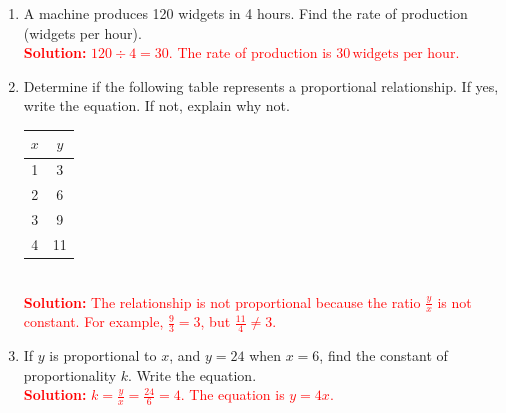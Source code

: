 \documentclass[10pt]{article}
\begin{document}
\begin{tcolorbox}[colframe=black!60, colback=white, 
coltitle=black, colbacktitle=black!15, fonttitle=\bfseries\Large, 
title=Exercises, halign title=center, left=10pt, right=10pt, top=10pt, bottom=35pt]
\begin{enumerate}[itemsep=2em]
    \item A machine produces 120 widgets in 4 hours. Find the rate of production (widgets per hour).\\
    \textcolor{red}{\textbf{Solution:} \(120 \div 4 = 30\). The rate of production is \(30 \, \text{widgets per hour}\).}

    \item Determine if the following table represents a proportional relationship. If yes, write the equation. If not, explain why not. \\
    \newline
    \begin{tabular}{|c|c|}
        \hline
        \(x\) & \(y\) \\ \hline
        1 & 3 \\ \hline
        2 & 6 \\ \hline
        3 & 9 \\ \hline
        4 & 11 \\ \hline
    \end{tabular}\\
    \textcolor{red}{\textbf{Solution:} The relationship is not proportional because the ratio \( \frac{y}{x} \) is not constant. For example, \( \frac{9}{3} = 3 \), but \( \frac{11}{4} \neq 3 \).}

    \item If \(y\) is proportional to \(x\), and \(y = 24\) when \(x = 6\), find the constant of proportionality \(k\). Write the equation.\\
    \textcolor{red}{\textbf{Solution:} \(k = \frac{y}{x} = \frac{24}{6} = 4\). The equation is \(y = 4x\).}
\end{enumerate}
\end{tcolorbox}

\vspace{1em}
\end{document}
